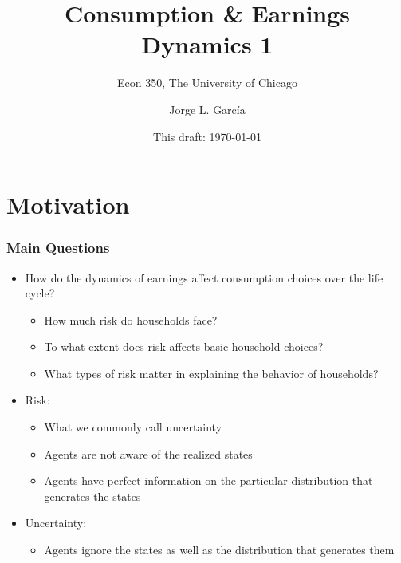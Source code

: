 

\title{Consumption \& Earnings Dynamics 1}
\subtitle{Econ 350, The University of Chicago}
\author{Jorge L. Garc\'{i}a}
\date{This draft: \today}






\begin{frame}[plain]
	\titlepage
\end{frame}



\section{Motivation}

\begin{frame}
	\frametitle{Main Questions}
\begin{itemize}
	\item How do the dynamics of earnings affect consumption choices over the life cycle?
		\begin{itemize}
			\item How much risk do households face?
			\item To what extent does risk affects basic household choices?
			\item What types of risk matter in explaining the behavior of households?		
		\end{itemize}
	\item Risk:
			\begin{itemize}
				\item What we commonly call uncertainty
				\item Agents are not aware of the realized states
				\item Agents have perfect information on the particular distribution that generates the states
			\end{itemize}
	\item Uncertainty:
			\begin{itemize}
				\item Agents ignore the states as well as the distribution that generates them
			\end{itemize}
\end{itemize}
\end{frame}

